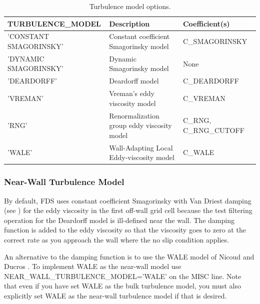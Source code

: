 \documentclass[11pt]{book}
\begin{document}
\begin{table}[ht]
\caption[Turbulence model options]{Turbulence model options.}
\label{turb_table}
\centering
\begin{tabular}{|lll|}
\hline
{\ct TURBULENCE\_MODEL} \hfill  & Description    \hfill                                         & Coefficient(s)  \hfill  \\ \hline
{\ct 'CONSTANT SMAGORINSKY'}    & Constant coefficient Smagorinsky model \cite{Smagorinsky:1}   & {\ct C\_SMAGORINSKY}  \\
{\ct 'DYNAMIC SMAGORINSKY'}     & Dynamic Smagorinsky model \cite{Germano:1991,Moin:1991}       & None                  \\
{\ct 'DEARDORFF'}               & Deardorff model \cite{Deardorff:1980,Pope:2000}               & {\ct C\_DEARDORFF}    \\
{\ct 'VREMAN'}                  & Vreman's eddy viscosity model \cite{Vreman:2004}              & {\ct C\_VREMAN}       \\
{\ct 'RNG'}                     & Renormalization group eddy viscosity model \cite{Yakhot:1989} & {\ct C\_RNG}, {\ct C\_RNG\_CUTOFF} \\
{\ct 'WALE'}                    & Wall-Adapting Local Eddy-viscosity model \cite{Nicoud:1999}   & {\ct C\_WALE} \\ \hline
\end{tabular}
\end{table}

\subsubsection*{Near-Wall Turbulence Model}

By default, FDS uses constant coefficient Smagorinsky \cite{Smagorinsky:1} with Van Driest damping (see \cite{Wilcox:1}) for the eddy viscosity in the first off-wall grid cell because the test filtering operation for the Deardorff model is ill-defined near the wall.  The damping function is added to the eddy viscosity so that the viscosity goes to zero at the correct rate as you approach the wall where the no slip condition applies.

An alternative to the damping function is to use the WALE model of Nicoud and Ducros \cite{Nicoud:1999}.  To implement WALE as the near-wall model use {\ct NEAR\_WALL\_TURBULENCE\_MODEL='WALE'} on the {\ct MISC} line.  Note that even if you have set WALE as the bulk turbulence model, you must also explicitly set WALE as the near-wall turbulence model if that is desired.
\end{document}
